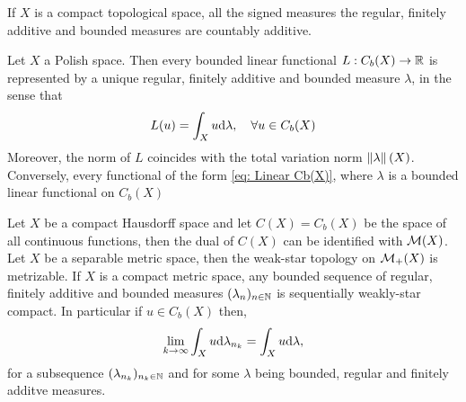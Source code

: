 %
If $X$ is a compact topological space, all the signed measures the regular, finitely additive and bounded measures are countably additive.
\begin{theorem}
	Let $X$ a Polish space. Then every bounded linear functional $L:C_b(X)\rightarrow \mathbb{R}$ is represented by a unique regular, finitely additive and bounded measure $\lambda$, in the sense that
	\begin{equation}
		L(u)=\int_{X}u\mathrm{d}\lambda, \quad \forall u \in C_b(X) \label{eq: Linear Cb(X)}
	\end{equation}
	Moreover, the norm of $L$ coincides with the total variation norm $\left\|\lambda\right\|(X)$. Conversely, every functional of the form \eqref{eq: Linear Cb(X)}, where $\lambda$ is a bounded linear functional on $C_b(X)$
\end{theorem}

Let $X$ be a compact Hausdorff space and let $C(X)=C_b(X)$ be the space of all continuous functions, then the dual of $C(X)$ can be identified with $\mathcal{M}(X)$. Let $X$ be a separable metric space, then the weak-star
topology on $\mathcal{M}_+(X)$ is metrizable. If $X$ is a compact metric space, any bounded sequence of regular, finitely additive and  bounded measures $(\lambda_n)_{n\in\mathbb{N}}$ is sequentially weakly-star compact.  In particular if $u\in C_b(X)$ then,
\begin{equation*}
	\lim_{k\rightarrow \infty}\int_{X}u\mathrm{d}\lambda_{n_k}=\int_X u \mathrm{d}\lambda,
\end{equation*}
for a subsequence $(\lambda_{n_k})_{n_k\in\mathbb{N}}$ and for some $\lambda$ being bounded, regular and finitely additve measures. 

